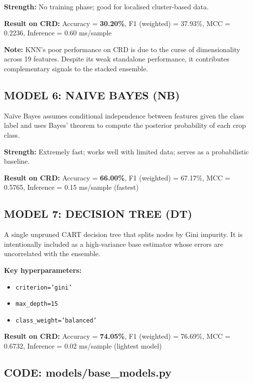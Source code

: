 \documentclass[12pt,a4paper,oneside]{report}
\begin{document}
\textbf{Strength:} No training phase; good for localised cluster-based data.

\textbf{Result on CRD:} Accuracy = \textbf{30.20\%}, F1 (weighted) = 37.93\%, MCC = 0.2236, Inference = 0.60 ms/sample

\textbf{Note:} KNN's poor performance on CRD is due to the curse of dimensionality across 19 features. Despite its weak standalone performance, it contributes complementary signals to the stacked ensemble.

\subsection{MODEL 6: NAIVE BAYES (NB)}
Na\"{i}ve Bayes assumes conditional independence between features given the class label and uses Bayes' theorem to compute the posterior probability of each crop class.

\textbf{Strength:} Extremely fast; works well with limited data; serves as a probabilistic baseline.

\textbf{Result on CRD:} Accuracy = \textbf{66.00\%}, F1 (weighted) = 67.17\%, MCC = 0.5765, Inference = 0.15 ms/sample (fastest)

\subsection{MODEL 7: DECISION TREE (DT)}
A single unpruned CART decision tree that splits nodes by Gini impurity. It is intentionally included as a high-variance base estimator whose errors are uncorrelated with the ensemble.

\textbf{Key hyperparameters:}
\begin{singlespacing}
\begin{itemize}[leftmargin=2cm, label={}, itemsep=0pt]
  \item \texttt{criterion='gini'}
  \item \texttt{max\_depth=15}
  \item \texttt{class\_weight='balanced'}
\end{itemize}
\end{singlespacing}

\textbf{Result on CRD:} Accuracy = \textbf{74.05\%}, F1 (weighted) = 76.69\%, MCC = 0.6732, Inference = 0.02 ms/sample (lightest model)

\subsection{CODE: models/base\_models.py}
\end{document}
